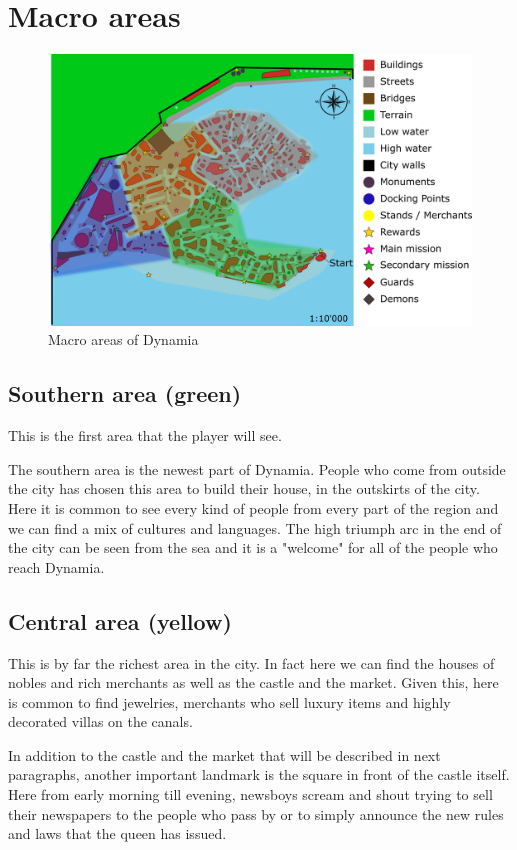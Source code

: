 \section{Macro areas}

\begin{figure}[H]
  \centering
  \includegraphics[width=\textwidth]{Images/Maps/dynamiaAreas}
  \caption{Macro areas of Dynamia}
\end{figure}

\subsection{Southern area (green)}
This is the first area that the player will see.

The southern area is the newest part of Dynamia. People who come from outside the city has chosen this area to build their house, in the outskirts of the city. Here it is common to see every kind of people from every part of the region and we can find a mix of cultures and languages. The high triumph arc in the end of the city can be seen from the sea and it is a "welcome" for all of the people who reach Dynamia.

\subsection{Central area (yellow)}
This is by far the richest area in the city. In fact here we can find the houses of  nobles and rich merchants as well as the castle and the market. Given this, here is common to find jewelries, merchants who sell luxury items and highly decorated villas on the canals.

In addition to the castle and the market that will be described in next paragraphs, another important landmark is the square in front of the castle itself. Here from early morning till evening, newsboys scream and shout trying to sell their newspapers to the people who pass by  or to simply announce the new rules and laws that the queen has issued.

